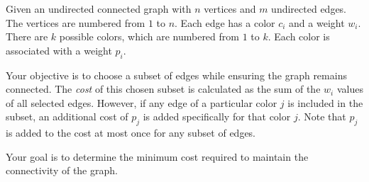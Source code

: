 Given an undirected connected graph with $n$ vertices and $m$ undirected edges.
The vertices are numbered from $1$ to $n$. 
Each edge has a color $c_i$ and a weight $w_i$.
There are $k$ possible colors, which are numbered from $1$ to $k$.
Each color is associated with a weight $p_i$.

Your objective is to choose a subset of edges while ensuring the graph remains connected.
The \textit{cost} of this chosen subset is calculated as the sum of the $w_i$ values of all selected edges.
However, if any edge of a particular color $j$ is included in the subset, 
an additional cost of $p_j$ is added specifically for that color $j$.
Note that $p_j$ is added to the cost at most once for any subset of edges.

Your goal is to determine the minimum cost required to maintain the connectivity of the graph.